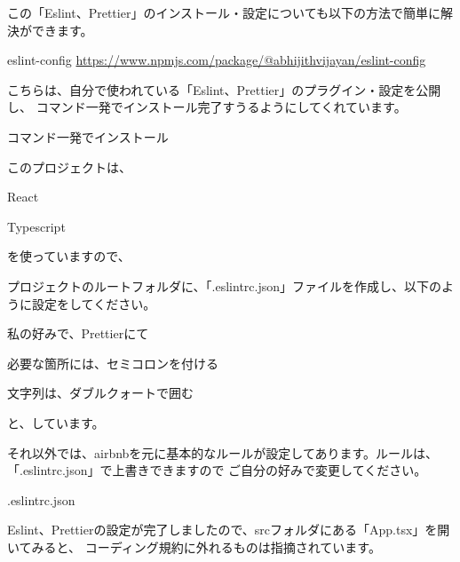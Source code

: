 この「Eslint、Prettier」のインストール・設定についても以下の方法で簡単に解決ができます。

eslint{-}config
\url{https://www.npmjs.com/package/@abhijithvijayan/eslint-config}

こちらは、自分で使われている「Eslint、Prettier」のプラグイン・設定を公開し、
コマンド一発でインストール完了すうるようにしてくれています。

\def\startercodeblockfontsize{}
\begin{starterterminal}[]{コマンド一発でインストール}\end{starterterminal}

このプロジェクトは、

\begin{starteritemize}
\item React
\item Typescript
\end{starteritemize}

を使っていますので、

プロジェクトのルートフォルダに、「.eslintrc.json」ファイルを作成し、以下のように設定をしてください。

私の好みで、Prettierにて

\begin{starteritemize}
\item 必要な箇所には、セミコロンを付ける
\item 文字列は、ダブルクォートで囲む
\end{starteritemize}

と、しています。

それ以外では、airbnbを元に基本的なルールが設定してあります。ルールは、「.eslintrc.json」で上書きできますので
ご自分の好みで変更してください。

\def\startercodeblockfontsize{}
\begin{starterprogram}[]{.eslintrc.json}\end{starterprogram}

Eslint、Prettierの設定が完了しましたので、srcフォルダにある「App.tsx」を開いてみると、
コーディング規約に外れるものは指摘されています。

